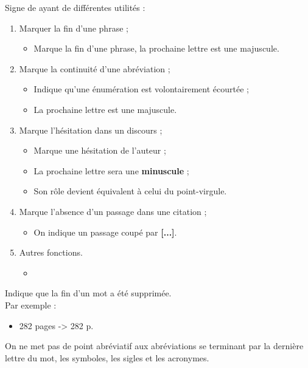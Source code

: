 \documentclass[10pt, french]{article}
\begin{document}
\begin{multicols*}{2}
\begin{definitionNOHFILLprop}
Signe de ayant de différentes utilités : 
\begin{enumerate}
	\item	Marquer la fin d'une phrase ; 
		\begin{itemize}
		\item	Marque la fin d'une phrase, la prochaine lettre est une majuscule.
		\end{itemize}
	\item	Marque la continuité d'une abréviation ;
		\begin{itemize}
		\item	Indique qu'une énumération est volontairement écourtée ;
		\item	La prochaine lettre est une majuscule.
		\end{itemize}
	\item	Marque l'hésitation dans un discours ; 
		\begin{itemize}
		\item	Marque une hésitation de l'auteur ;
		\item	La prochaine lettre sera une \textbf{minuscule} ;
		\item	Son rôle devient équivalent à celui du point-virgule.
		\end{itemize}
	\item	Marque l'absence d'un passage dans une citation ;
		\begin{itemize}
		\item	On indique un passage coupé par \textbf{[...]}.
		\end{itemize}
	\item	Autres fonctions.
		\begin{itemize}
		\item	
		\end{itemize}
\end{enumerate}
\end{definitionNOHFILLprop}

\begin{definitionNOHFILLprop}
Indique que la fin d'un mot a été supprimée.	\\

Par exemple :
\begin{itemize}
	\item	282 pages -> 282 p.
\end{itemize}

\begin{astuces}
On ne met pas de point abréviatif aux abréviations se terminant par la dernière lettre du mot, les symboles, les sigles et les acronymes.	\\


\end{astuces}
\end{definitionNOHFILLprop}
\end{multicols*}
\end{document}
